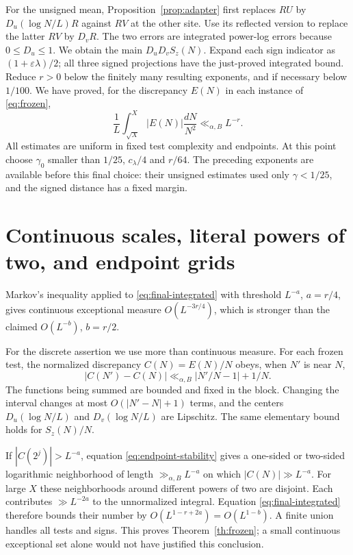 \documentclass[11pt]{article}
\theoremstyle{remark}\newtheorem{remark}[theorem]{Remark}
\begin{document}
For the unsigned mean, Proposition~\ref{prop:adapter} first replaces
$RU$ by $D_u(\log N/L)R$ against $RV$ at the other site.
Use its reflected version to replace the latter $RV$ by $D_vR$.
The two errors are integrated power-log errors because $0\le D_u\le1$.
We obtain the main $D_uD_v S_z(N)$.
Expand each sign indicator as $(1+\varepsilon\lambda)/2$; all three
signed projections have the just-proved integrated bound. Reduce
$r>0$ below the finitely many resulting exponents, and if necessary
below $1/100$. We have proved, for the discrepancy $E(N)$ in each
instance of \eqref{eq:frozen},
\begin{equation}\label{eq:final-integrated}
       \frac1L\int_{\sqrt X}^X |E(N)|\frac{dN}{N^2}\ll_{\alpha,B}L^{-r}.
\end{equation}
All estimates are uniform in fixed test complexity and endpoints.
At this point choose $\gamma_0$ smaller than
$1/25$, $c_\lambda/4$ and $r/64$. The preceding exponents are
available before this final choice: their unsigned estimates used only
$\gamma<1/25$, and the signed distance has a fixed margin.

\section{Continuous scales, literal powers of two, and endpoint grids}
Markov's inequality applied to \eqref{eq:final-integrated} with
threshold $L^{-a}$, $a=r/4$, gives continuous exceptional measure
$O(L^{-3r/4})$, which is stronger than the claimed $O(L^{-b})$,
$b=r/2$.

For the discrete assertion we use more than continuous measure.
For each frozen test, the normalized discrepancy $C(N)=E(N)/N$
obeys, when $N'$ is near $N$,
\begin{equation}\label{eq:endpoint-stability}
 |C(N')-C(N)|\ll_{\alpha,B}|N'/N-1|+1/N.
\end{equation}
The functions being summed are bounded and fixed in the block.
Changing the interval changes at most $O(|N'-N|+1)$ terms, and the
centers $D_u(\log N/L)$ and $D_v(\log N/L)$ are Lipschitz.
The same elementary bound holds for $S_z(N)/N$.

If $|C(2^j)|>L^{-a}$, equation \eqref{eq:endpoint-stability} gives a
one-sided or two-sided logarithmic neighborhood of length
$\gg_{\alpha,B}L^{-a}$ on which $|C(N)|\gg L^{-a}$.
For large $X$ these neighborhoods around different powers of two are
disjoint. Each contributes $\gg L^{-2a}$ to the unnormalized integral.
Equation \eqref{eq:final-integrated} therefore bounds their number by
$O(L^{1-r+2a})=O(L^{1-b})$. A finite union handles all tests and signs.
This proves Theorem~\ref{th:frozen}; a small continuous exceptional
set alone would not have justified this conclusion.
\end{document}
